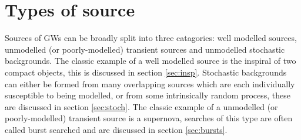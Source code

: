 \section{Types of source}\label{sec:voc}

Sources of GWs can be broadly split into three catagories: well modelled sources, unmodelled (or poorly-modelled) transient sources and unmodelled stochastic backgrounds. The classic example of a well modelled source is the inspiral of two compact objects, this is discussed in section \ref{sec:insp}. Stochastic backgrounds can either be formed from many overlapping sources which are each individually susceptible to being modelled, or from some intrinsically random process, these are discussed in section \ref{sec:stoch}. The classic example of a unmodelled (or poorly-modelled) transient source is a supernova, searches of this type are often called burst searched and are discussed in section \ref{sec:bursts}.

